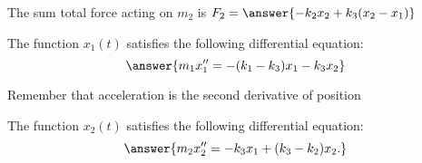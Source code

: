 \documentclass{ximera}%
\begin{document}
\begin{problem}
The sum total force acting on $m_2$ is $F_2 = \answer{-k_2 x_2 + k_3(x_2-x_1)}$
\end{problem}

\begin{problem} The function $x_1(t)$ satisfies the following differential equation:
\[ \answer{m_1 x_1'' = -(k_1-k_3)x_1 -k_3 x_2}\]
\begin{hint} Remember that acceleration is the second derivative of position \end{hint}

\end{problem}

\begin{problem} The function $x_2(t)$ satisfies the following differential equation:
\[ \answer{ m_2 x_2'' = -k_3 x_1 + (k_3-k_2)x_2.}\]
\end{problem}

\end{document}

